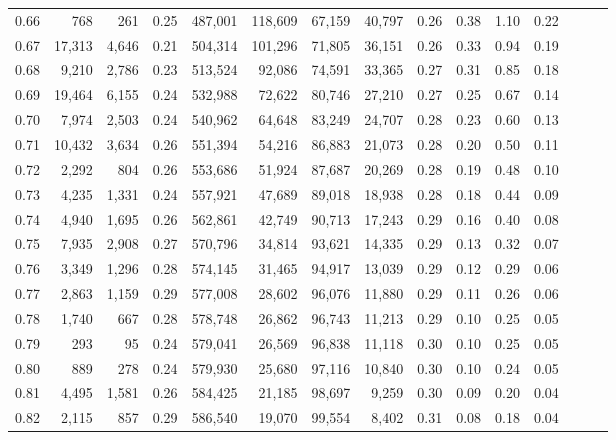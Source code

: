 \begin{tabular}{rrrrrrrrrrrrrrr}
0.66 &     768 &    261 &  0.25 &  487,001 &  118,609 &   67,159 &   40,797 &  0.26 &  0.38 &  1.10 &      0.22 \\
0.67 &  17,313 &  4,646 &  0.21 &  504,314 &  101,296 &   71,805 &   36,151 &  0.26 &  0.33 &  0.94 &      0.19 \\
0.68 &   9,210 &  2,786 &  0.23 &  513,524 &   92,086 &   74,591 &   33,365 &  0.27 &  0.31 &  0.85 &      0.18 \\
0.69 &  19,464 &  6,155 &  0.24 &  532,988 &   72,622 &   80,746 &   27,210 &  0.27 &  0.25 &  0.67 &      0.14 \\
0.70 &   7,974 &  2,503 &  0.24 &  540,962 &   64,648 &   83,249 &   24,707 &  0.28 &  0.23 &  0.60 &      0.13 \\
0.71 &  10,432 &  3,634 &  0.26 &  551,394 &   54,216 &   86,883 &   21,073 &  0.28 &  0.20 &  0.50 &      0.11 \\
0.72 &   2,292 &    804 &  0.26 &  553,686 &   51,924 &   87,687 &   20,269 &  0.28 &  0.19 &  0.48 &      0.10 \\
0.73 &   4,235 &  1,331 &  0.24 &  557,921 &   47,689 &   89,018 &   18,938 &  0.28 &  0.18 &  0.44 &      0.09 \\
0.74 &   4,940 &  1,695 &  0.26 &  562,861 &   42,749 &   90,713 &   17,243 &  0.29 &  0.16 &  0.40 &      0.08 \\
0.75 &   7,935 &  2,908 &  0.27 &  570,796 &   34,814 &   93,621 &   14,335 &  0.29 &  0.13 &  0.32 &      0.07 \\
0.76 &   3,349 &  1,296 &  0.28 &  574,145 &   31,465 &   94,917 &   13,039 &  0.29 &  0.12 &  0.29 &      0.06 \\
0.77 &   2,863 &  1,159 &  0.29 &  577,008 &   28,602 &   96,076 &   11,880 &  0.29 &  0.11 &  0.26 &      0.06 \\
0.78 &   1,740 &    667 &  0.28 &  578,748 &   26,862 &   96,743 &   11,213 &  0.29 &  0.10 &  0.25 &      0.05 \\
0.79 &     293 &     95 &  0.24 &  579,041 &   26,569 &   96,838 &   11,118 &  0.30 &  0.10 &  0.25 &      0.05 \\
0.80 &     889 &    278 &  0.24 &  579,930 &   25,680 &   97,116 &   10,840 &  0.30 &  0.10 &  0.24 &      0.05 \\
0.81 &   4,495 &  1,581 &  0.26 &  584,425 &   21,185 &   98,697 &    9,259 &  0.30 &  0.09 &  0.20 &      0.04 \\
0.82 &   2,115 &    857 &  0.29 &  586,540 &   19,070 &   99,554 &    8,402 &  0.31 &  0.08 &  0.18 &      0.04 \\

\end{tabular}
